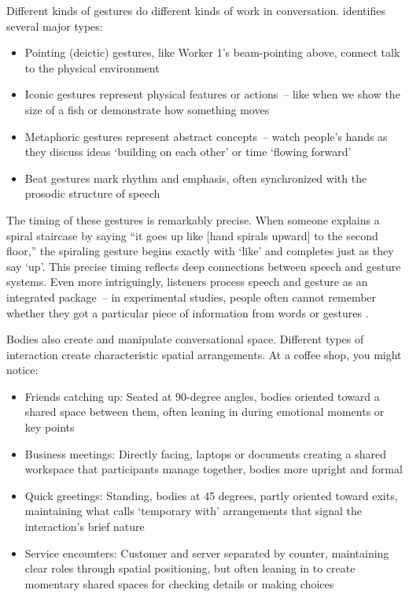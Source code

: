 Different kinds of gestures do different kinds of work in conversation. \citet{mcneill1992} identifies several major types:
\begin{itemize}[noitemsep]
  \item Pointing (deictic) gestures, like Worker 1's beam-pointing above, connect talk to the physical environment 
  \item Iconic gestures represent physical features or actions~-- like when we show the size of a fish or demonstrate how something moves 
  \item Metaphoric gestures represent abstract concepts~-- watch people's hands as they discuss ideas `building on each other' or time `flowing forward' 
  \item Beat gestures mark rhythm and emphasis, often synchronized with the prosodic structure of speech 
\end{itemize}
The timing of these gestures is remarkably precise. When someone explains a spiral staircase by saying ``it goes up like [hand spirals upward] to the second floor,'' the spiraling gesture begins exactly with `like' and completes just as they say `up'. This precise timing reflects deep connections between speech and gesture systems. Even more intriguingly, listeners process speech and gesture as an integrated package~-- in experimental studies, people often cannot remember whether they got a particular piece of information from words or gestures \citep{gurney2013}.

Bodies also create and manipulate conversational space. Different types of interaction create characteristic spatial arrangements. At a coffee shop, you might notice:
\begin{itemize}[noitemsep]
  \item Friends catching up: Seated at 90-degree angles, bodies oriented toward a shared space between them, often leaning in during emotional moments or key points
  \item Business meetings: Directly facing, laptops or documents creating a shared workspace that participants manage together, bodies more upright and formal
  \item Quick greetings: Standing, bodies at 45 degrees, partly oriented toward exits, maintaining what \citet{kendon1990} calls `temporary with' arrangements that signal the interaction's brief nature
  \item Service encounters: Customer and server separated by counter, maintaining clear roles through spatial positioning, but often leaning in to create momentary shared spaces for checking details or making choices
\end{itemize}

